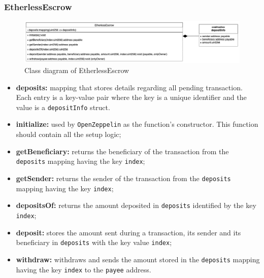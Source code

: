 \subsubsection{EtherlessEscrow}
	\begin{figure}[H]
		\centering
		\includegraphics[width=1\linewidth]{diagrammi/etherless-smart/EtherlessEscrow.jpg}
		\caption{Class diagram of EtherlessEscrow}
	\end{figure}

	\begin{itemize}
		\item \textbf{deposits:} mapping that stores details regarding all pending transaction. Each entry is a key-value pair where the key is a unique identifier and the value is a \texttt{depositInfo} struct.	
		\end{itemize}
	\begin{itemize}
		\item \textbf{initialize:} used by \texttt{OpenZeppelin} as the function's constructor. This function should contain all the setup logic;
		\item \textbf{getBeneficiary:} returns the beneficiary of the transaction from the \texttt{deposits} mapping having the key \texttt{index};
		\item \textbf{getSender:} returns the sender of the transaction from the \texttt{deposits} mapping having the key \texttt{index};
		\item \textbf{depositsOf:} returns the amount deposited in \texttt{deposits} identified by the key \texttt{index};
		\item \textbf{deposit:} stores the amount sent during a transaction, its sender and its beneficiary in \texttt{deposits} with the key value \texttt{index};
		\item \textbf{withdraw:} withdraws and sends the amount stored in the \texttt{deposits} mapping having the key \texttt{index} to the \texttt{payee} address.
	\end{itemize}

